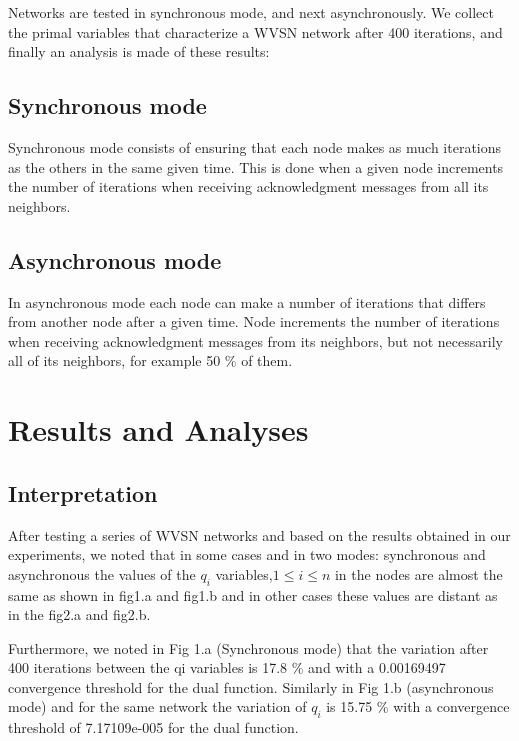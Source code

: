 \documentclass[12pt,a4]{article}
\begin{document}
Networks are tested in synchronous mode, and next asynchronously. We collect the primal variables that characterize a WVSN network after 400 iterations, and finally an analysis is made of these results:

\subsection{Synchronous mode }

\hspace{0.6cm}Synchronous mode consists of ensuring that each node makes as much iterations as the others in the same given time.  This is done when a given node increments the number of iterations when receiving acknowledgment messages from all its neighbors.

\subsection{Asynchronous mode}

\hspace{0.6cm}In asynchronous mode each node can make a number of iterations that differs from another node after a given time.  Node increments the number of iterations when receiving acknowledgment messages from its neighbors, but not necessarily all of its neighbors, for example 50 \% of them.

\section{Results and Analyses}
\subsection{Interpretation}

\hspace{0.6cm}After testing a series of WVSN networks and based on the results obtained in our experiments, we noted that in some cases and in two modes: synchronous and asynchronous the values of the $q_i$ variables,$1\le i \le n$ in the nodes are almost the same as shown in fig1.a and fig1.b and in other cases these values are distant as in the fig2.a and fig2.b.

Furthermore, we noted in Fig 1.a (Synchronous mode) that the variation after 400 iterations between the qi variables is 17.8 \% and with a 0.00169497 convergence threshold for the dual function. Similarly in Fig 1.b (asynchronous mode) and for the same network the variation of $q_i$ is 15.75 \% with a convergence threshold of 7.17109e-005 for the dual function.
\end{document}
